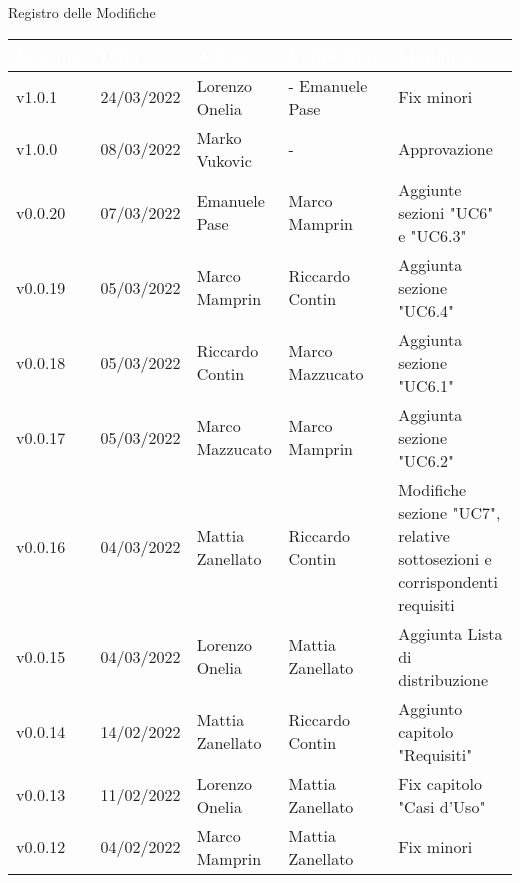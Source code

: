\begin{center}
  \huge{Registro delle Modifiche}
\end{center}

\renewcommand\arraystretch{1,5}
{\centering
\begin{longtable}{|C{1.8cm}|C{2.1cm}|C{2cm}|C{2.4cm}|L{4.4cm}|}
  \hline
  \textcolor[HTML]{FFFFFF}{\textbf{Versione}} & \textcolor[HTML]{FFFFFF}{\textbf{Data}} & \textcolor[HTML]{FFFFFF}{\textbf{Autore}}  & \textcolor[HTML]{FFFFFF}{\textbf{Verificatore}} & \textcolor[HTML]{FFFFFF}{\textbf{Modifica}}    \\ \hline
  v1.0.1        & 24/03/2022    & Lorenzo Onelia  & - Emanuele Pase    & Fix minori                  \\ \hline
  v1.0.0           & 08/03/2022   & Marko Vukovic & - & Approvazione     \\ \hline
  v0.0.20           & 07/03/2022    & Emanuele Pase  & Marco Mamprin         & Aggiunte sezioni "UC6" e "UC6.3" \\ \hline
  v0.0.19           & 05/03/2022    & Marco Mamprin  &  Riccardo Contin   & Aggiunta sezione "UC6.4"                   \\ \hline
  v0.0.18           & 05/03/2022    & Riccardo Contin &  Marco Mazzucato    & Aggiunta sezione "UC6.1" \\ \hline
  v0.0.17           & 05/03/2022    & Marco Mazzucato  & Marco Mamprin     & Aggiunta sezione "UC6.2"   \\ \hline
  v0.0.16           & 04/03/2022    & Mattia Zanellato &  Riccardo Contin      & Modifiche sezione "UC7", relative sottosezioni e corrispondenti requisiti \\ \hline
  v0.0.15       & 04/03/2022    & Lorenzo Onelia  & Mattia Zanellato     & Aggiunta Lista di distribuzione                  \\ \hline
  v0.0.14           & 14/02/2022    & Mattia Zanellato  & Riccardo Contin     & Aggiunto capitolo "Requisiti"                   \\ \hline
  v0.0.13           & 11/02/2022    & Lorenzo Onelia    & Mattia Zanellato    & Fix capitolo "Casi d'Uso"                       \\ \hline
  v0.0.12           & 04/02/2022    & Marco Mamprin     & Mattia Zanellato    & Fix minori                                      \\ \hline

\end{longtable}}
